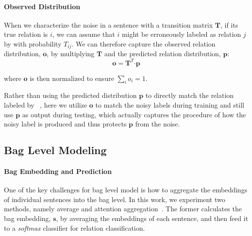 \paragraph{Observed Distribution}
When we characterize the noise in a sentence with a transition matrix $\mathbf{T}$,
if its true relation is $i$, we can assume that  $i$ might be erroneously labeled as relation $j$
by \DS  with probability $T_{ij}$.
We can therefore capture the observed relation distribution, $\mathbf{o}$, by
multiplying %
$\mathbf{T}$ and the predicted relation distribution, $\mathbf{p}$:
 \begin{equation}
\mathbf{o} = \mathbf{T}^T \bm\cdot \mathbf{p}
\label{eq_transition}
 \end{equation}

where %
$\mathbf{o}$ is then normalized to ensure $\sum_i{o_i}=1$.

Rather than using the predicted distribution $\mathbf{p}$ to directly match the relation labeled by \DS~\cite{zeng2015distant,lin2016neural},
here we utilize $\mathbf{o}$ to match the noisy labels during training and still use $\mathbf{p}$ as output during testing,
which actually captures the procedure of how the noisy label is produced and thus protects $\mathbf{p}$ from the noise.
%

\subsection{Bag Level Modeling \label{sec:baglevelmodeling}}
\paragraph{Bag Embedding and Prediction}
One of the key challenges for bag level model is how to aggregate the embeddings of individual sentences into the bag level.
In this work, we experiment two methods, namely average and attention aggregation~\cite{lin2016neural}.
The former calculates the bag embedding, $\mathbf{s}$, by averaging the embeddings of each sentence, and  then feed it to a \emph{softmax} classifier for relation classification.

